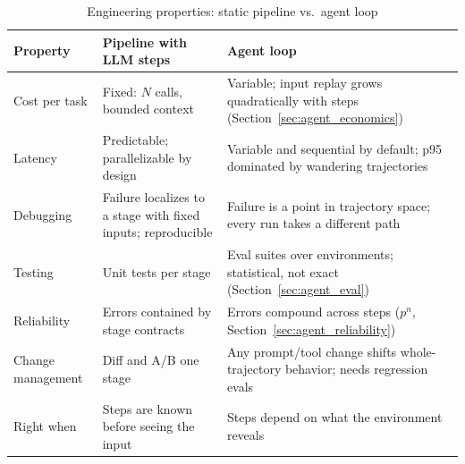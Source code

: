 \begin{table}[H]
\centering
\caption{Engineering properties: static pipeline vs.\ agent loop}
\label{tab:pipeline_vs_agent}
\begin{tabularx}{\textwidth}{p{2.6cm}XX}
\toprule
\textbf{Property} & \textbf{Pipeline with LLM steps} & \textbf{Agent loop} \\
\midrule
Cost per task & Fixed: $N$ calls, bounded context & Variable; input replay grows quadratically with steps (Section~\ref{sec:agent_economics}) \\
Latency & Predictable; parallelizable by design & Variable and sequential by default; p95 dominated by wandering trajectories \\
Debugging & Failure localizes to a stage with fixed inputs; reproducible & Failure is a point in trajectory space; every run takes a different path \\
Testing & Unit tests per stage & Eval suites over environments; statistical, not exact (Section~\ref{sec:agent_eval}) \\
Reliability & Errors contained by stage contracts & Errors compound across steps ($p^n$, Section~\ref{sec:agent_reliability}) \\
Change management & Diff and A/B one stage & Any prompt/tool change shifts whole-trajectory behavior; needs regression evals \\
Right when & Steps are known before seeing the input & Steps depend on what the environment reveals \\
\bottomrule
\end{tabularx}
\end{table}

